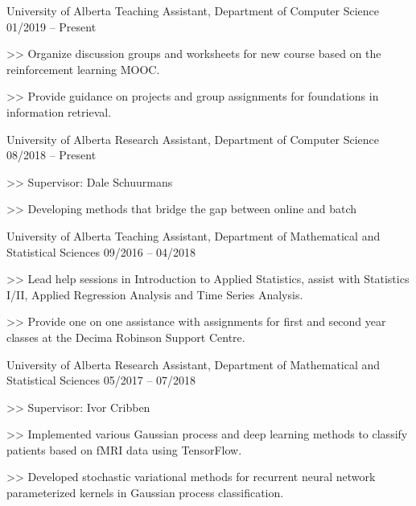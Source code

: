 \begin{cventries}
\cventry
    {University of Alberta}
    {Teaching Assistant, Department of Computer Science}
    {01/2019 -- Present}
    {
      \begin{cvitems}
        \item[>>] Organize discussion groups and worksheets for new course based on the reinforcement learning MOOC.
        \item[>>] Provide guidance on projects and group assignments for foundations in information retrieval.
      \end{cvitems}
    }


\cventry
    {University of Alberta}
    {Research Assistant, Department of Computer Science}
    {08/2018 -- Present}
    {
      \begin{cvitems}
      \item[>>] Supervisor: Dale Schuurmans 
      \item[>>] Developing methods that bridge the gap between online and batch
      \end{cvitems}
    }


  \cventry
    {University of Alberta}
    {Teaching Assistant, Department of Mathematical and Statistical Sciences} {09/2016 -- 04/2018}
    {
      \begin{cvitems}
        \item[>>] Lead help sessions in Introduction to Applied Statistics, assist with Statistics I/II, Applied Regression Analysis and Time Series Analysis.
        \item[>>] Provide one on one assistance with assignments for first and second year classes at the Decima Robinson Support Centre.
      \end{cvitems}
    }


\cventry
    {University of Alberta}
    {Research Assistant, Department of Mathematical and Statistical Sciences}    {05/2017 -- 07/2018}
    {
      \begin{cvitems}
        \item[>>] Supervisor: Ivor Cribben
        \item[>>] Implemented various Gaussian process and deep learning methods to classify patients based on fMRI data using TensorFlow.
        \item[>>] Developed stochastic variational methods for recurrent neural network parameterized kernels in Gaussian process classification.
      \end{cvitems}
    }

\end{cventries}
